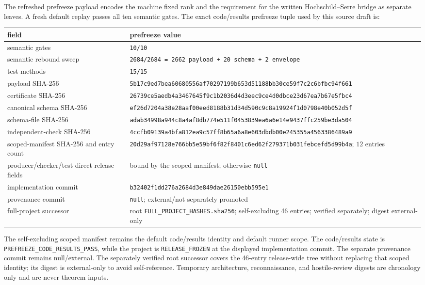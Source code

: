 The refreshed prefreeze payload encodes the machine fixed rank and the
requirement for the written Hochschild--Serre bridge as separate leaves.  A
fresh default replay passes all ten semantic gates.  The exact code/results
prefreeze tuple used by this source draft is:
\begin{center}
\scriptsize
\begin{tabular}{@{}>{\raggedright\arraybackslash}p{}>{\raggedright\arraybackslash}p{}@{}}
\toprule
field & prefreeze value\\
\midrule
semantic gates & \texttt{10/10}\\
semantic rebound sweep
& \texttt{2684/2684 = 2662 payload + 20 schema + 2 envelope}\\
test methods & \texttt{15/15}\\
payload SHA-256
& \texttt{5b17c9ed7bea60680556af70297199b653d51188bb30ce59f7c2c6bfbc94f661}\\
certificate SHA-256
& \texttt{26739ce5aedb4a3467645f9c1b2036d4d3eec9ce4d0dbce23d67ea7b67e5fbc4}\\
canonical schema SHA-256
& \texttt{ef26d7204a38e28aaf00eed8188b31d34d590c9c8a19924f1d0798e40b052d5f}\\
schema-file SHA-256
& \texttt{adab34998a944c8a4af8db774e511f0453839ea6a6e14e9437ffc259be3da504}\\
independent-check SHA-256
& \texttt{4ccfb09139a4bfa812ea9c57ff8b65a6a8e603dbdb00e245355a4563386489a9}\\
scoped-manifest SHA-256 and entry count
& \texttt{20d29af97128e766bb5e59bf6f82f8401c6ed62f279371b031febcefd5d99b4a};
\(12\) entries\\
producer/checker/test direct release fields
& bound by the scoped manifest; otherwise \texttt{null}\\
implementation commit
& \texttt{b32402f1dd276a2684d3e849dae26150ebb595e1}\\
provenance commit & \texttt{null}; external/not separately promoted\\
full-project successor
& root \texttt{FULL\_PROJECT\_HASHES.sha256}; self-excluding 46 entries;
verified separately; digest external-only\\
\bottomrule
\end{tabular}
\end{center}

The self-excluding scoped manifest remains the default code/results identity
and default runner scope.  The code/results state is
\texttt{PREFREEZE\_CODE\_RESULTS\_PASS}, while the project is
\texttt{RELEASE\_FROZEN} at the displayed implementation commit.  The
separate provenance commit remains null/external.  The separately verified root successor covers
the 46-entry release-wide tree without replacing that scoped identity; its
digest is external-only to avoid self-reference.  Temporary architecture,
reconnaissance, and hostile-review digests are chronology only and are never
theorem inputs.

